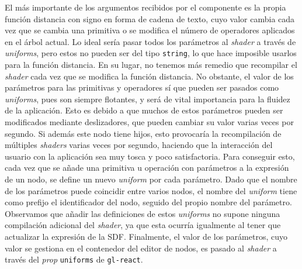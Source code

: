 El  más importante de los argumentos recibidos por el componente es la propia función distancia con signo en forma de cadena de texto, cuyo valor cambia cada vez que se cambia una primitiva o se modifica el número de operadores aplicados en el árbol actual. Lo ideal sería pasar todos los parámetros al \textit{shader} a través de \textit{uniforms}, pero estos no pueden ser del tipo \texttt{string}, lo que hace imposible usarlos para la función distancia. En su lugar, no tenemos más remedio que recompilar el \textit{shader} cada vez que se modifica la función distancia. No obstante, el valor de los parámetros para las primitivas y operadores sí que pueden ser pasados como \textit{uniforms}, pues son siempre flotantes, y será de vital importancia para la fluidez de la aplicación. Esto es debido a que muchos de estos parámetros pueden ser modificados mediante deslizadores, que pueden cambiar su valor varias veces por segundo. Si además este nodo tiene hijos, esto provocaría la recompilación de múltiples \textit{shaders} varias veces por segundo, haciendo que la interacción del usuario con la aplicación sea muy tosca y poco satisfactoria. Para conseguir esto, cada vez que se añade una primitiva u operación con parámetros a la expresión de un nodo, se define un nuevo \textit{uniform} por cada parámetro. Dado que el nombre de los parámetros puede coincidir entre varios nodos, el nombre del \textit{uniform} tiene como prefijo el identificador del nodo, seguido del propio nombre del parámetro. Observamos que añadir las definiciones de estos \textit{uniforms} no supone ninguna compilación adicional del \textit{shader}, ya que esta ocurría igualmente al tener que actualizar la expresión de la SDF. Finalmente, el valor de los parámetros, cuyo valor se gestiona en el contenedor del editor de nodos, es pasado al \textit{shader} a través del \textit{prop} \texttt{uniforms} de \texttt{gl-react}.\newline

